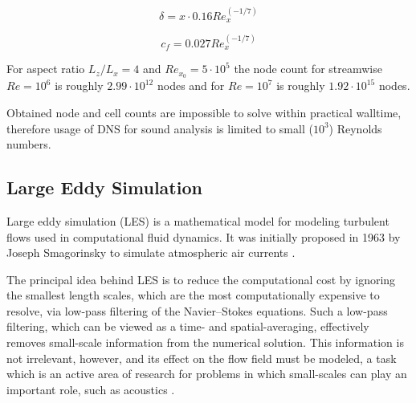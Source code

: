 \begin{equation} \label{eq:delta}
\delta = x \cdot  0.16 Re_x^{(-1/7)}
\end{equation}

\begin{equation} \label{eq:cf}
c_f = 0.027 Re_x^{(-1/7)}
\end{equation}

For aspect ratio $L_z / L_x = 4$ and $Re_{x_0} = 5 \cdot 10^5$ the node count for streamwise $Re = 10^6$ is roughly $2.99 \cdot 10^{12}$ nodes and for $Re = 10^7$ is roughly $1.92 \cdot 10^{15}$ nodes.

Obtained node and cell counts are impossible to solve within practical walltime, therefore usage of DNS for sound analysis is limited to small ($10^3$) Reynolds numbers.




\subsection{Large Eddy Simulation} \label{LES}
Large eddy simulation (LES) is a mathematical model for modeling turbulent flows used in computational fluid dynamics. It was initially proposed in 1963 by Joseph Smagorinsky to simulate atmospheric air currents \citep{LES1}.

The principal idea behind LES is to reduce the computational cost by ignoring the smallest length scales, which are the most computationally expensive to resolve, via low-pass filtering of the Navier–Stokes equations. Such a low-pass filtering, which can be viewed as a time- and spatial-averaging, effectively removes small-scale information from the numerical solution. This information is not irrelevant, however, and its effect on the flow field must be modeled, a task which is an active area of research for problems in which small-scales can play an important role, such as acoustics \citep{LES2}.

